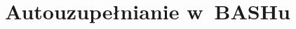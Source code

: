 \documentclass[10pt,t]{beamer}
\begin{document}

















\section{Autouzupełnianie w~BASHu}






\end{document}
